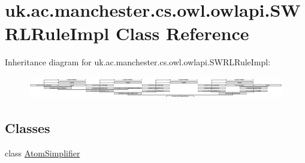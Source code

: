 \hypertarget{classuk_1_1ac_1_1manchester_1_1cs_1_1owl_1_1owlapi_1_1_s_w_r_l_rule_impl}{\section{uk.\-ac.\-manchester.\-cs.\-owl.\-owlapi.\-S\-W\-R\-L\-Rule\-Impl Class Reference}
\label{classuk_1_1ac_1_1manchester_1_1cs_1_1owl_1_1owlapi_1_1_s_w_r_l_rule_impl}
}
Inheritance diagram for uk.\-ac.\-manchester.\-cs.\-owl.\-owlapi.\-S\-W\-R\-L\-Rule\-Impl\-:\begin{figure}[H]
\begin{center}
\leavevmode
\includegraphics[height=0.992154cm]{classuk_1_1ac_1_1manchester_1_1cs_1_1owl_1_1owlapi_1_1_s_w_r_l_rule_impl}
\end{center}
\end{figure}
\subsection*{Classes}
\begin{DoxyCompactItemize}
\item 
class \hyperlink{classuk_1_1ac_1_1manchester_1_1cs_1_1owl_1_1owlapi_1_1_s_w_r_l_rule_impl_1_1_atom_simplifier}{Atom\-Simplifier}
\end{DoxyCompactItemize}
